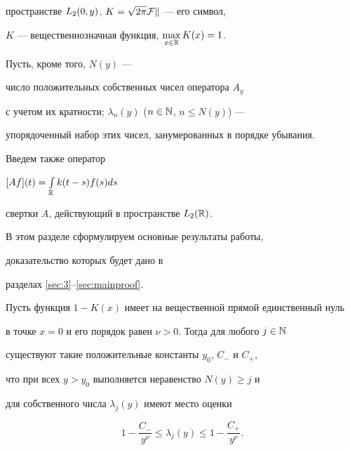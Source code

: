 пространстве $L_{2}(0,y)$, $K=\sqrt{2\pi}\cal F k$ --- его символ,


$K$ --- вещественнозначная функция, $\max\limits_{x\in\Bbb R}K(x)=1$.


Пусть, кроме того, $N(y)$ --- 


число положительных собственных чисел оператора $A_{y}$ 


с учетом их кратности; $\lambda_{n}(y)$ ($n\in\Bbb N$, $n\leqslant N(y)$) --- 


упорядоченный набор этих чисел, занумерованных в порядке убывания.


Введем также оператор


$[A f](t)=\int\limits_{\Bbb R}k(t-s)f(s)ds$


свертки $A$, действующий в пространстве $L_{2}(\Bbb R)$.





В этом разделе сформулируем основные результаты работы, 


доказательство которых будет дано в 


разделах \ref{sec:3}--\ref{sec:mainproof}.








\begin{thms} \label{th:main}


Пусть функция $1-K(x)$ имеет на вещественной прямой единственный нуль 


в точке $x=0$ и его порядок равен $\nu>0$. Тогда для любого $j\in\Bbb N$


существуют такие положительные константы $y_{0}$, $C_{-}$ и $C_{+}$, 


что при всех $y>y_{0}$ выполняется неравенство $N(y)\geqslant j$ и 


для собственного числа $\lambda_{j}(y)$ имеют место оценки


$$


1-\frac{C_{-}}{y^{\nu}} \leqslant \lambda_{j}(y)


\leqslant 1-\frac{C_{+}}{y^{\nu}}.


$$


\end{thms}








